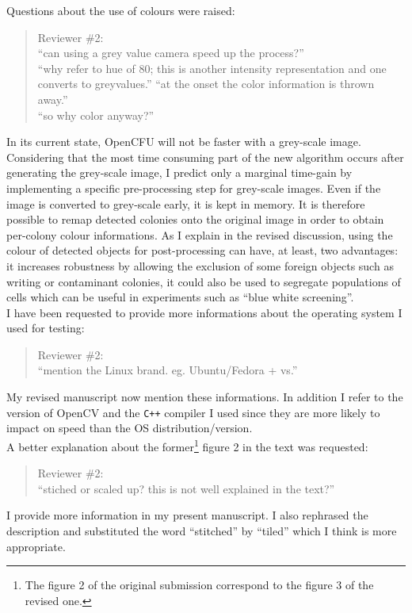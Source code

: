 \documentclass{letter}
\begin{document}
\begin{letter}{}
 Questions about the use of colours were raised:
   \begin{quote}
	 Reviewer \#2:\\
	 ``can using a grey value camera speed up the process?''\\
	 ``why refer to hue of 80; this is another intensity representation
and one converts to greyvalues.''
``at the onset the color information is thrown away.''\\
``so why color anyway?''\\
 \end{quote}
 In its current state, OpenCFU will not be faster with a grey-scale image. 
 Considering that the most time consuming part of the new algorithm occurs after generating the grey-scale image, 
 I predict only a marginal time-gain by implementing a specific pre-processing step for grey-scale images.
 Even if the image is converted to grey-scale early, it is kept in memory. 
 It is therefore possible to remap detected colonies onto the original image in order to obtain per-colony colour informations.
 As I explain in the revised discussion, using the colour of detected objects for post-processing can have, at least, two advantages: 
 it increases robustness by allowing the exclusion of some foreign objects such as writing or contaminant colonies, 
 it could also be used to segregate populations of cells which can be useful in experiments such as ``blue white screening''.\\
 
I have been requested to provide more informations about the operating system I
used for testing:
    \begin{quote}
	 Reviewer \#2:\\
	 ``mention the Linux brand. eg. Ubuntu/Fedora + vs.''
 \end{quote}
My revised manuscript now mention these informations. In addition I refer to the version of OpenCV and the \texttt{C++}
 compiler I used since  they are more likely to impact on speed than the OS distribution/version.\\
 
A better explanation about the former\footnote{The figure 2 of the original submission correspond to the figure 3 of the revised one.} 
  figure 2 in the text was requested: 
    \begin{quote}
	 Reviewer \#2:\\
	 ``stiched or scaled up? this is not well explained in the text?''
 	\end{quote}
  I provide more information in my present manuscript.
  I also rephrased the description and substituted the word ``stitched'' by  ``tiled'' which I think is more appropriate.\\


\end{letter}
\end{document}
